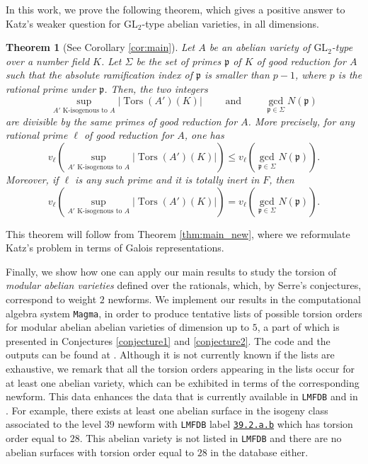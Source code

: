 \documentclass[a4paper,11pt]{amsart}
\newtheorem*{theorem*}{Theorem}
\theoremstyle{definition}
\newcommand{\p}{\mathfrak{p}}
\newcommand{\GL}{\text{GL}}
\DeclareMathOperator{\Tors}{Tors}
\begin{document}
In this work, we prove the following theorem, which gives a positive answer to Katz's weaker question for \(\GL_2\)-type abelian varieties, in all dimensions.
\begin{theorem*}[{See Corollary \ref{cor:main}}] \label{thm:main2}
    Let \(A\) be an abelian variety of \(\GL_2\)-type over a number field \(K\). Let \(\Sigma\) be the set of primes \(\p\) of \(K\) of good reduction for \(A\) such that the absolute ramification index of \(\p\) is smaller than \(p-1\), where \(p\) is the rational prime under \(\p\). Then, the two integers
    \[
    \sup_{A'\text{ K-isogenous to }A} |\Tors(A')(K)|\qquad \text{ and } \qquad \gcd_{\p \in \Sigma} N(\p)
    \]
    are divisible by the same primes of good reduction for \(A\). More precisely, for any rational prime \(\ell\) of good reduction for \(A\), one has
    \[
    v_\ell\left(\sup_{A'\text{ K-isogenous to }A} |\Tors(A')(K)|\right)\le v_\ell\left(\gcd_{\p \in \Sigma} N(\p)\right).
    \]
    Moreover, if \(\ell\) is any such prime and it is totally inert in \(F\), then
    \[
    v_\ell\left(\sup_{A'\text{ K-isogenous to }A} |\Tors(A')(K)|\right)=v_\ell\left(\gcd_{\p \in \Sigma} N(\p)\right).
    \]
\end{theorem*}
This theorem will follow from Theorem \ref{thm:main_new}, where we reformulate Katz's problem in terms of Galois representations.

Finally, we show how one can apply our main results to study the torsion of \emph{modular abelian varieties} defined over the rationals, which, by Serre's conjectures, correspond to weight \(2\) newforms. 
We implement our results in the computational algebra system \texttt{Magma}, in order to produce tentative lists of possible torsion orders for modular abelian abelian varieties of dimension up to \(5\), a part of which is presented in Conjectures \ref{conjecture1} and \ref{conjecture2}.
The code and the outputs can be found at \cite{Alessandri2026MagmaVarieties}. Although it is not currently known if the lists are exhaustive, we remark that all the torsion orders appearing in the lists occur for at least one abelian variety, which can be exhibited in terms of the corresponding newform. This data enhances the data that is currently available in \texttt{LMFDB} \cite{LMFDBDatabase} and in \cite{Nicholls2018DescentCurves}. 
For example, there exists at least one abelian surface in the isogeny class associated to the level \(39\) newform with \texttt{LMFDB} label \texttt{\href{https://www.lmfdb.org/ModularForm/GL2/Q/holomorphic/39/2/a/b/}{39.2.a.b}} which
has torsion order equal to \(28\). This abelian variety is not listed in \texttt{LMFDB} and there are no abelian surfaces with torsion order equal to \(28\) in the database either.
\end{document}
